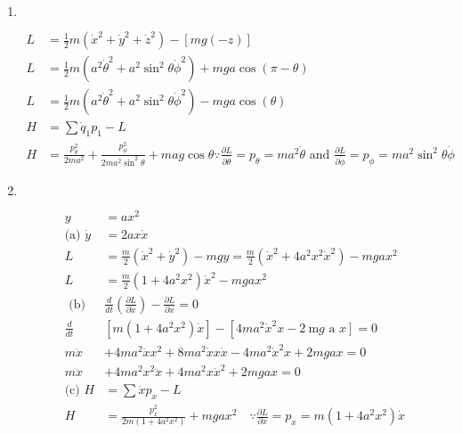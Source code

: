 \begin{enumerate}
\begin{answer}
\begin{align*}
{		$m l^{2} \ddot{\theta}-m l \ddot{y}_{1} \sin \theta+m g l \sin \theta=0$}
		\end{align*}
	\end{answer}
	\item $\left. \right. $
	\begin{answer}
		\begin{align*}
		L&=\frac{1}{2} m\left(\dot{x}^{2}+\dot{y}^{2}+\dot{z}^{2}\right)-[m g(-z)]\\
		L&=\frac{1}{2} m\left(a^{2} \dot{\theta}^{2}+a^{2} \sin ^{2} \theta \dot{\phi}^{2}\right)+m g a \cos (\pi-\theta)\\
		L&=\frac{1}{2} m\left(a^{2} \dot{\theta}^{2}+a^{2} \sin ^{2} \theta \dot{\phi}^{2}\right)-m g a \cos (\theta)\\
		H&=\sum \dot{q}_{1} p_{1}-L\\
		H&=\frac{p_{\theta}^{2}}{2 m a^{2}}+\frac{p_{\phi}^{2}}{2 m a^{2} \sin ^{2} \theta}+m a g \cos \theta \because \frac{\partial L}{\partial \dot{\theta}}=p_{\theta}=m a^{2} \dot{\theta}\text{ and } \frac{\partial L}{\partial \dot{\phi}}=p_{\phi}=m a^{2} \sin ^{2} \theta \dot{\phi}
		\end{align*}
	\end{answer}
	\item $\left. \right. $
	\begin{answer}
		\begin{align*}
		y&=a x^{2}\\
		\text{(a) }\dot{y}&=2 a x \dot{x}\\
		L&=\frac{m}{2}\left(\dot{x}^{2}+\dot{y}^{2}\right)-m g y=\frac{m}{2}\left(\dot{x}^{2}+4 a^{2} x^{2} \dot{x}^{2}\right)-m g a x^{2}\\
		L&=\frac{m}{2}\left(1+4 a^{2} x^{2}\right) \dot{x}^{2}-m g a x^{2}\\
	\text{	(b) }&\frac{d}{d t}\left(\frac{\partial L}{\partial \dot{x}}\right)-\frac{\partial L}{\partial x}=0\\
	\frac{d}{d t}&\left[m\left(1+4 a^{2} x^{2}\right) \dot{x}\right]-\left[4 m a^{2} \dot{x}^{2} x-2 \mathrm{~m} g\right.\text{ a }\left.x\right]=0\\
	m \ddot{x}&+4 m a^{2} \ddot{x} x^{2}+8 m a^{2} \dot{x} x \dot{x}-4 m a^{2} \dot{x}^{2} x+2 m g a x=0\\
	m \ddot{x}&+4 m a^{2} x^{2} \ddot{x}+4 m a^{2} x \dot{x}^{2}+2 m g a x=0\\
	\text{(c) }H&=\sum \dot{x} p_{x}-L\\
	H&=\frac{p_{x}^{2}}{2 m\left(1+4 a^{2} x^{2}\right)}+m g a x^{2} \quad \because \frac{\partial L}{\partial \dot{x}}=p_{x}=m\left(1+4 a^{2} x^{2}\right) \dot{x}

\end{align*}
\end{answer}
\end{enumerate}
